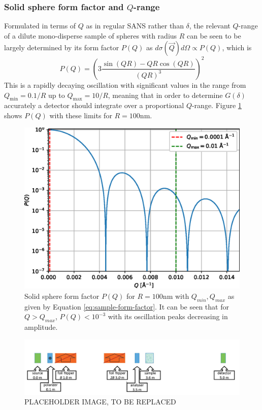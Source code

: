 \documentclass{article}
\begin{document}
\newpage

\subsubsection{Solid sphere form factor and $Q$-range}
Formulated in terms of $Q$ as in regular SANS rather than $\delta$, the relevant $Q$-range of a dilute mono-disperse sample of spheres with radius $R$ can be seen to be largely determined by its form factor $P(Q)$ as $d\sigma(\vec{Q})d\Omega\propto P(Q)$, which is \cite{rekveldt1996}
\begin{equation}
	P(Q) = \left(3\frac{\sin(QR) - QR\cos(QR)}{\left(QR\right)^3}\right)^2\label{eq:sample-form-factor}
\end{equation}
This is a rapidly decaying oscillation with significant values in the range from $Q_{\text{min}} = 0.1/R$ up to $Q_{\text{max}} = 10/R$, meaning that in order to determine $G(\delta)$ accurately a detector should integrate over a proportional $Q$-range.  Figure \ref{fig:analytical-P} shows $P(Q)$ with these limits for $R = 100\unit{\nano\meter}$.  

\begin{figure}
	\centering
	\includegraphics[width=0.5\linewidth]{analytical-P-log}
	\caption{Solid sphere form factor $P(Q)$ for $R = 100\unit{\nano\meter}$ with $Q_{min}, Q_{max}$ as given by Equation \eqref{eq:sample-form-factor}. It can be seen that for $Q > Q_{max}$, $P(Q) < 10^{-3}$ with its oscillation peaks decreasing in amplitude.}
	\label{fig:analytical-P}
\end{figure}

\newpage
\begin{figure}
	\centering
	\includegraphics[width=\linewidth]{config-placeholder}
	\caption{PLACEHOLDER IMAGE, TO BE REPLACED}
	\label{fig:instrument-config}
\end{figure}
\end{document}
